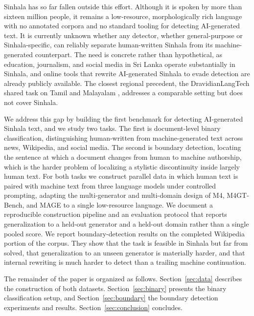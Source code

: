 \documentclass[11pt]{article}
\begin{document}
Sinhala has so far fallen outside this effort. Although it is spoken by more than sixteen million people, it remains a low-resource, morphologically rich language with no annotated corpora and no standard tooling for detecting AI-generated text. It is currently unknown whether any detector, whether general-purpose or Sinhala-specific, can reliably separate human-written Sinhala from its machine-generated counterpart. The need is concrete rather than hypothetical, as education, journalism, and social media in Sri Lanka operate substantially in Sinhala, and online tools that rewrite AI-generated Sinhala to evade detection are already publicly available. The closest regional precedent, the DravidianLangTech shared task on Tamil and Malayalam \citep{kodali-etal-2025-bytesizedllm, barua-etal-2025-cuet}, addresses a comparable setting but does not cover Sinhala.

We address this gap by building the first benchmark for detecting AI-generated Sinhala text, and we study two tasks. The first is document-level binary classification, distinguishing human-written from machine-generated text across news, Wikipedia, and social media. The second is boundary detection, locating the sentence at which a document changes from human to machine authorship, which is the harder problem of localizing a stylistic discontinuity inside largely human text. For both tasks we construct parallel data in which human text is paired with machine text from three language models under controlled prompting, adapting the multi-generator and multi-domain design of M4, M4GT-Bench, and MAGE \citep{wang-etal-2024-m4, wang-etal-2024-m4gt, li-etal-2024-mage} to a single low-resource language. We document a reproducible construction pipeline and an evaluation protocol that reports generalization to a held-out generator and a held-out domain rather than a single pooled score. We report boundary-detection results on the completed Wikipedia portion of the corpus. They show that the task is feasible in Sinhala but far from solved, that generalization to an unseen generator is materially harder, and that internal rewriting is much harder to detect than a trailing machine continuation.

The remainder of the paper is organized as follows. Section~\ref{sec:data} describes the construction of both datasets. Section~\ref{sec:binary} presents the binary classification setup, and Section~\ref{sec:boundary} the boundary detection experiments and results. Section~\ref{sec:conclusion} concludes.
\end{document}
